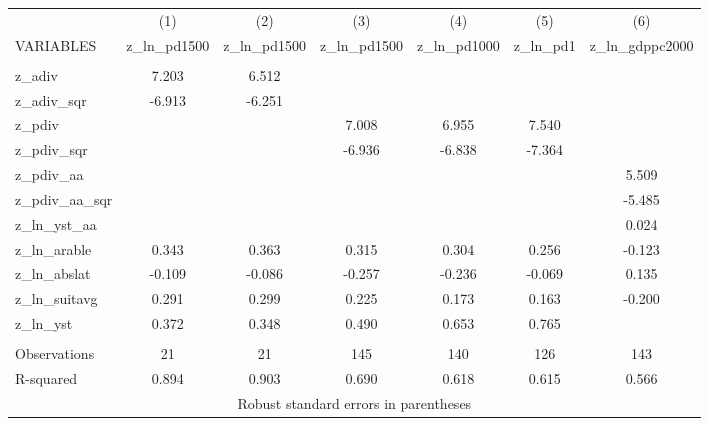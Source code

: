 \documentclass[]{article}
\begin{document}
\begin{tabular}{lcccccc} \hline
 & (1) & (2) & (3) & (4) & (5) & (6) \\
VARIABLES & z\_ln\_pd1500 & z\_ln\_pd1500 & z\_ln\_pd1500 & z\_ln\_pd1000 & z\_ln\_pd1 & z\_ln\_gdppc2000 \\ \hline
 &  &  &  &  &  &  \\
z\_adiv & 7.203 & 6.512 &  &  &  &  \\
z\_adiv\_sqr & -6.913 & -6.251 &  &  &  &  \\
z\_pdiv &  &  & 7.008 & 6.955 & 7.540 &  \\
z\_pdiv\_sqr &  &  & -6.936 & -6.838 & -7.364 &  \\
z\_pdiv\_aa &  &  &  &  &  & 5.509 \\
z\_pdiv\_aa\_sqr &  &  &  &  &  & -5.485 \\
z\_ln\_yst\_aa &  &  &  &  &  & 0.024 \\
z\_ln\_arable & 0.343 & 0.363 & 0.315 & 0.304 & 0.256 & -0.123 \\
z\_ln\_abslat & -0.109 & -0.086 & -0.257 & -0.236 & -0.069 & 0.135 \\
z\_ln\_suitavg & 0.291 & 0.299 & 0.225 & 0.173 & 0.163 & -0.200 \\
z\_ln\_yst & 0.372 & 0.348 & 0.490 & 0.653 & 0.765 &  \\
 &  &  &  &  &  &  \\
Observations & 21 & 21 & 145 & 140 & 126 & 143 \\
 R-squared & 0.894 & 0.903 & 0.690 & 0.618 & 0.615 & 0.566 \\ \hline
\multicolumn{7}{c}{ Robust standard errors in parentheses} \\
\end{tabular}
\end{document}
